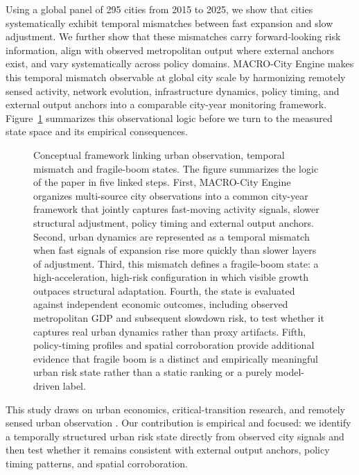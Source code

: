 \documentclass[oneside,pdflatex,sn-nature]{sn-jnl}
\begin{document}
Using a global panel of 295 cities from 2015 to 2025, we show that cities systematically exhibit temporal mismatches between fast expansion and slow adjustment. We further show that these mismatches carry forward-looking risk information, align with observed metropolitan output where external anchors exist, and vary systematically across policy domains. MACRO-City Engine makes this temporal mismatch observable at global city scale by harmonizing remotely sensed activity, network evolution, infrastructure dynamics, policy timing, and external output anchors into a comparable city-year monitoring framework. Figure~\ref{fig:evidence_chain} summarizes this observational logic before we turn to the measured state space and its empirical consequences.

\begin{figure}[H]
  \centering
  \caption{Conceptual framework linking urban observation, temporal mismatch and fragile-boom states. The figure summarizes the logic of the paper in five linked steps. First, MACRO-City Engine organizes multi-source city observations into a common city-year framework that jointly captures fast-moving activity signals, slower structural adjustment, policy timing and external output anchors. Second, urban dynamics are represented as a temporal mismatch when fast signals of expansion rise more quickly than slower layers of adjustment. Third, this mismatch defines a fragile-boom state: a high-acceleration, high-risk configuration in which visible growth outpaces structural adaptation. Fourth, the state is evaluated against independent economic outcomes, including observed metropolitan GDP and subsequent slowdown risk, to test whether it captures real urban dynamics rather than proxy artifacts. Fifth, policy-timing profiles and spatial corroboration provide additional evidence that fragile boom is a distinct and empirically meaningful urban risk state rather than a static ranking or a purely model-driven label.}
  \label{fig:evidence_chain}
\end{figure}
\FloatBarrier

This study draws on urban economics, critical-transition research, and remotely sensed urban observation \cite{combes2012productivity,moretti2012real,batty2013newscience,scheffer2009early,dakos2012methods,lenton2008tipping,henderson2018measuring,jean2016combining,naik2017streetscore,gebru2017using}. Our contribution is empirical and focused: we identify a temporally structured urban risk state directly from observed city signals and then test whether it remains consistent with external output anchors, policy timing patterns, and spatial corroboration.
\end{document}

